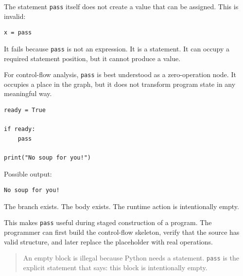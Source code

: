 The statement \texttt{pass} itself does not create a value that can be assigned. This is invalid:

\begin{verbatim}
x = pass
\end{verbatim}

It fails because \texttt{pass} is not an expression. It is a statement. It can occupy a required statement position, but it cannot produce a value.

For control-flow analysis, \texttt{pass} is best understood as a zero-operation node. It occupies a place in the graph, but it does not transform program state in any meaningful way.

\begin{verbatim}
ready = True

if ready:
    pass

print("No soup for you!")
\end{verbatim}

Possible output:

\begin{verbatim}
No soup for you!
\end{verbatim}

The branch exists. The body exists. The runtime action is intentionally empty.

This makes \texttt{pass} useful during staged construction of a program. The programmer can first build the control-flow skeleton, verify that the source has valid structure, and later replace the placeholder with real operations.

\begin{quote}
An empty block is illegal because Python needs a statement. \texttt{pass} is the explicit statement that says: this block is intentionally empty.
\end{quote}